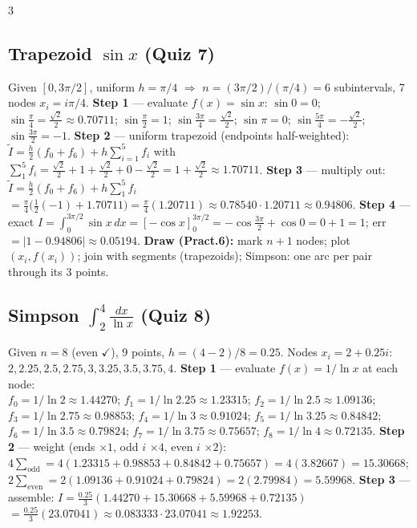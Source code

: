 \documentclass[9pt]{extarticle}
\newcommand{\wk}[1]{\textbf{\textcolor{OliveGreen}{#1}}}
\begin{document}
\begin{multicols}{3}
\begin{sloppypar}
\subsection{Trapezoid $\sin x$ (Quiz 7)}
Given $[0,3\pi/2]$, uniform $h=\pi/4$ $\Rightarrow$ $n=(3\pi/2)/(\pi/4)=6$ subintervals, 7 nodes $x_i=i\pi/4$.
\wk{Step 1} — evaluate $f(x)=\sin x$: $\sin0=0$; $\sin\frac\pi4=\tfrac{\sqrt2}2\approx0.70711$; $\sin\frac\pi2=1$; $\sin\frac{3\pi}4=\tfrac{\sqrt2}2$; $\sin\pi=0$; $\sin\frac{5\pi}4=-\tfrac{\sqrt2}2$; $\sin\frac{3\pi}2=-1$.
\wk{Step 2} — uniform trapezoid (endpoints half-weighted): $\tilde I=\tfrac h2(f_0{+}f_6)+h\sum_{i=1}^{5}f_i$ with $\sum_{1}^{5}f_i=\tfrac{\sqrt2}2+1+\tfrac{\sqrt2}2+0-\tfrac{\sqrt2}2=1+\tfrac{\sqrt2}2\approx1.70711$.
\wk{Step 3} — multiply out: $\tilde I=\tfrac h2(f_0{+}f_6)+h\sum_{1}^{5}f_i$\\
$=\tfrac\pi4\big(\tfrac12(-1)+1.70711\big)=\tfrac\pi4(1.20711)\approx0.78540\cdot1.20711\approx0.94806$.
\wk{Step 4} — exact $I=\int_0^{3\pi/2}\sin x\,dx=[-\cos x]_0^{3\pi/2}=-\cos\tfrac{3\pi}2+\cos0=0+1=1$; err $=|1-0.94806|\approx0.05194$.
\wk{Draw (Pract.6):} mark $n{+}1$ nodes; plot $(x_i,f(x_i))$; join with segments (trapezoids); Simpson: one arc per pair through its 3 points.

\subsection{Simpson $\int_2^4\tfrac{dx}{\ln x}$ (Quiz 8)}
Given $n=8$ (even $\checkmark$), 9 points, $h=(4-2)/8=0.25$. Nodes $x_i=2+0.25i$: $2,2.25,2.5,2.75,3,3.25,3.5,3.75,4$.
\wk{Step 1} — evaluate $f(x)=1/\ln x$ at each node:\\
$f_0=1/\ln2\approx1.44270$; $f_1=1/\ln2.25\approx1.23315$; $f_2=1/\ln2.5\approx1.09136$;\\
$f_3=1/\ln2.75\approx0.98853$; $f_4=1/\ln3\approx0.91024$; $f_5=1/\ln3.25\approx0.84842$;\\
$f_6=1/\ln3.5\approx0.79824$; $f_7=1/\ln3.75\approx0.75657$; $f_8=1/\ln4\approx0.72135$.
\wk{Step 2} — weight (ends $\times1$, odd $i$ $\times4$, even $i$ $\times2$): $4\sum_{\text{odd}}=4(1.23315{+}0.98853{+}0.84842{+}0.75657)=4(3.82667)=15.30668$; $2\sum_{\text{even}}=2(1.09136{+}0.91024{+}0.79824)=2(2.79984)=5.59968$.
\wk{Step 3} — assemble: $I=\tfrac{0.25}3(1.44270+15.30668+5.59968+0.72135)$\\
$=\tfrac{0.25}3(23.07041)\approx0.083333\cdot23.07041\approx1.92253$.


\end{sloppypar}
\end{multicols}
\end{document}
